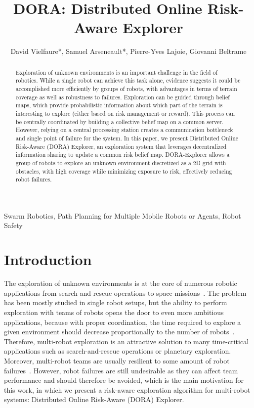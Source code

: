 \documentclass[letterpaper, 10 pt, conference]{ieeeconf}
\title{\LARGE \bf DORA: Distributed Online Risk-Aware Explorer}
\author{David Vielfaure*, Samuel Arseneault*, Pierre-Yves Lajoie, Giovanni Beltrame}
\begin{document}
\maketitle

\begin{abstract}
    Exploration of unknown environments is an important challenge in the
    field of robotics. While a single robot can achieve this task alone,
    evidence suggests it could be accomplished more efficiently by
    groups of robots, with advantages in terms of terrain coverage as
    well as robustness to failures. Exploration can be guided through
    belief maps, which provide probabilistic information about which
    part of the terrain is interesting to explore (either based on risk
    management or reward). This process can be centrally coordinated by
    building a collective belief map on a common server. However,
    relying on a central processing station creates a communication
    bottleneck and single point of failure for the system. In this
    paper, we present Distributed Online Risk-Aware (DORA) Explorer, an
    exploration system that leverages decentralized information sharing
    to update a common risk belief map. DORA-Explorer allows a group of
    robots to explore an unknown environment discretized as a 2D grid
    with obstacles, with high coverage while minimizing exposure to
    risk, effectively reducing robot failures.
\end{abstract}

\begin{keywords}
Swarm Robotics, Path Planning for Multiple Mobile Robots or Agents, Robot Safety
\end{keywords}


\section{Introduction}
The exploration of unknown environments is at the core of numerous
robotic applications from search-and-rescue operations
\cite{matos2016multiple} to space
missions~\cite{fong2005interaction}. The problem has been mostly
studied in single robot setups, but the ability to perform exploration
with teams of robots opens the door to even more ambitious
applications, because with proper coordination, the time required to
explore a given environment should decrease proportionally to the
number of robots~\cite{burgard2005coordinated}. Therefore, multi-robot
exploration is an attractive solution to many time-critical
applications such as search-and-rescue operations or planetary
exploration. Moreover, multi-robot teams are usually resilient to some
amount of robot
failures~\cite{ramachandran2019resilience,wehbe2021probabilistic,winfield2006safety}. However,
robot failures are still undesirable as they can affect team
performance and should therefore be avoided, which is the main
motivation for this work, in which we present a risk-aware exploration
algorithm for multi-robot systems: Distributed Online Risk-Aware
(DORA) Explorer.
\end{document}
